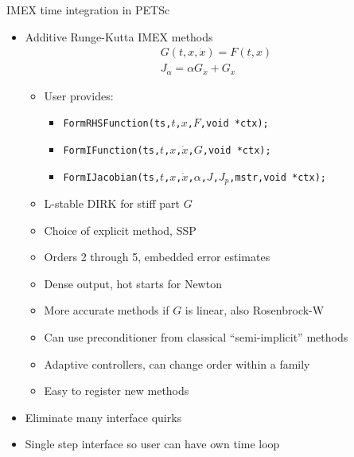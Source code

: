 \begin{frame}{IMEX time integration in PETSc}
  \begin{itemize}
  \item Additive Runge-Kutta IMEX methods
    \begin{gather*}
      G(t,x,\dot x) = F(t,x) \\
      J_\alpha = \alpha G_{\dot x} + G_x
    \end{gather*}
    \begin{itemize}
    \item User provides:
      \begin{itemize}
      \item \texttt{FormRHSFunction(ts,$t$,$x$,$F$,void *ctx);}
      \item \texttt{FormIFunction(ts,$t$,$x$,$\dot x$,$G$,void *ctx);}
      \item \texttt{FormIJacobian(ts,$t$,$x$,$\dot x$,$\alpha$,$J$,$J_{p}$,mstr,void *ctx);}
      \end{itemize}
    \item L-stable DIRK for stiff part $G$
    \item Choice of explicit method, \eg SSP
    \item Orders 2 through 5, embedded error estimates
    \item Dense output, hot starts for Newton
    \item More accurate methods if $G$ is linear, also Rosenbrock-W
    \item Can use preconditioner from classical ``semi-implicit'' methods
    \item Adaptive controllers, can change order within a family
    \item Easy to register new methods
    \end{itemize}
  \item Eliminate many interface quirks
  \item Single step interface so user can have own time loop
  \end{itemize}
\end{frame}
